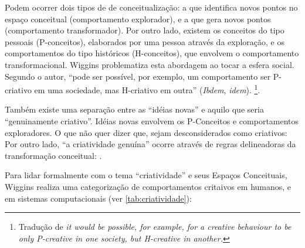 Podem ocorrer dois tipos de de conceitualização: a que identifica novos pontos no espaço conceitual (comportamento explorador), e a que gera novos pontos (comportamento transformador). Por outro lado, existem os conceitos do tipo pessoais (P-conceitos), elaborados por uma pessoa através da exploração, e os comportamentos do tipo históricos (H-conceitos), que envolvem o comportamento transformacional. Wiggins problematiza esta abordagem ao tocar a esfera social. Segundo o autor, ``pode ser possível, por exemplo, um comportamento ser P-criativo em uma sociedade, mas H-criativo em outra'' (\emph{Ibdem}, \emph{idem}). \footnote{Tradução de \emph{it would be possible, for example, for a creative behaviour to be only P-creative in one society, but H-creative in another.}}.

Também existe uma separação entre as ``idéias novas'' e aquilo que seria ``genuinamente criativo''.  Idéias novas envolvem os P-Conceitos e comportamentos exploradores. O que não quer dizer que, sejam desconsiderados como criativos:  Por outro lado, ``a criatividade genuína'' ocorre através de regras delineadoras da transformação conceitual: .

Para lidar formalmente com o tema ``criatividade'' e seus Espaços Conceituais, Wiggins realiza uma categorização de comportamentos critaivos em humanos, e em sistemas computacionais (ver \autoref{tab:criatividade}):

